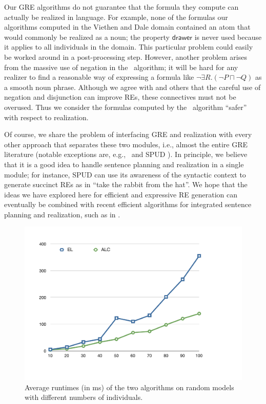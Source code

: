Our GRE algorithms do not guarantee that the formula they compute can
actually be realized in language.  For example, none of the formulas
our algorithms computed in the Viethen and Dale domain contained an
atom that would commonly be realized as a noun; the property
$\mathsf{drawer}$ is never used because it applies to all individuals
in the domain.  This particular problem could easily be worked around
in a post-processing step.  However, another problem arises from the
massive use of negation in the \alc\ algorithm; it will be hard for
any realizer to find a reasonable way of expressing a formula like
$\neg \exists R.(\neg P \sqcap \neg Q)$ as a smooth noun phrase.
Although we agree with  and
others that the careful use of negation and disjunction can improve
REs, these connectives must not be overused.  Thus we consider the
formulas computed by the \el\ algorithm ``safer'' with respect to
realization.



Of course, we share the problem of interfacing GRE and realization
with every other approach that separates these two modules, i.e.,
almost the entire GRE literature (notable exceptions are, e.g.,~ and SPUD \cite{Stone1998a}).  In principle, we
believe that it is a good idea to handle sentence planning and
realization in a single module; for instance, SPUD can use its
awareness of the syntactic context to generate succinct REs as in
``take the rabbit from the hat''.  We hope that the ideas we have
explored here for efficient and expressive RE generation can
eventually be combined with recent efficient algorithms for integrated
sentence planning and realization, such as in .


\begin{figure}[t]
  \centering
  \includegraphics[width=\columnwidth]{runtimes}\vspace*{-2ex}
  \caption{Average runtimes (in ms) of the two algorithms on random
    models with different numbers of individuals.}
  \label{fig:runtimes}\vspace*{-1.5ex}
\end{figure}


